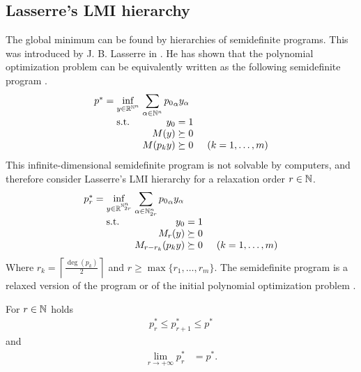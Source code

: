 \subsection{Lasserre's LMI hierarchy}
The global minimum can be found by hierarchies of semidefinite programs.
This was introduced by J. B. Lasserre in \cite{Lasserre}.
He has shown that the polynomial optimization problem  can be equivalently written as the following semidefinite program .
\begin{align}
  \arraycolsep=1.4pt
  \begin{array}{rclrcl@{\hskip0.5cm}l}
    p^* &=& \displaystyle \inf_{y\in\R^{\N^n}} & \multicolumn{3}{l}{\displaystyle \sum_{\alpha\in\N^n}{p_0}_\alpha y_\alpha} \\
    && \text{s.t.} & y_0 &=& 1\\
    &&& M(y) &\succeq& 0\\
    &&& M(p_ky) &\succeq& 0 & (k = 1,\ldots,m)
  \end{array}\labeleq{POP:opt:SDP}
\end{align}
This infinite-dimensional semidefinite program is not solvable by computers, and therefore consider Lasserre's LMI hierarchy  for a relaxation order $r\in\mathbb{N}$.
\begin{align}
  \arraycolsep=1.4pt
  \begin{array}{rclrcl@{\hskip0.5cm}l}
    p_r^* &=& \displaystyle \inf_{y\in\R^{\N^n_{2r}}} & \multicolumn{2}{l}{\displaystyle \sum_{\alpha\in\N^n_{2r}}{p_0}_\alpha y_\alpha} \\
    && \text{s.t.} & y_0 &=& 1\\
    &&& M_r(y) &\succeq& 0\\
    &&& M_{r-r_k}(p_ky) &\succeq& 0 & (k = 1,\ldots,m)
  \end{array}\labeleq{POP:opt:SDPr}
\end{align}
Where $r_k = \left\lceil\frac{\deg(p_k)}{2}\right\rceil$ and $r\geq\max\{r_1, \ldots, r_m\}$.
The semidefinite program  is a relaxed version of the program  or of the initial polynomial optimization problem .

\begin{theorem}
  For $r\in\mathbb{N}$ holds
  \begin{align}
    p^*_r \leq p^*_{r+1} \leq p^*
  \end{align}
  and
  \begin{align}
    \lim_{r\rightarrow+\infty}p^*_r &= p^*.
  \end{align}
\end{theorem}


